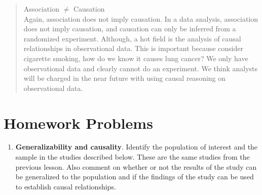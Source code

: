 \documentclass[
]{book}
\providecommand{\tightlist}{%
  \setlength{\itemsep}{0pt}\setlength{\parskip}{0pt}}
\begin{document}
\begin{quote}
Association \(\neq\) Causation\\
Again, association does not imply causation. In a data analysis, association does not imply causation, and causation can only be inferred from a randomized experiment. Although, a hot field is the analysis of causal relationships in observational data. This is important because consider cigarette smoking, how do we know it causes lung cancer? We only have observational data and clearly cannot do an experiment. We think analysts will be charged in the near future with using causal reasoning on observational data.
\end{quote}

\hypertarget{homework-problems-2}{%
\section{Homework Problems}\label{homework-problems-2}}

\begin{enumerate}
\def\labelenumi{\arabic{enumi}.}
\tightlist
\item
  \textbf{Generalizability and causality}. Identify the population of interest and the sample in the studies described below. These are the same studies from the previous lesson. Also comment on whether or not the results of the study can be generalized to the population and if the findings of the study can be used to establish causal relationships.
\end{enumerate}
\end{document}
